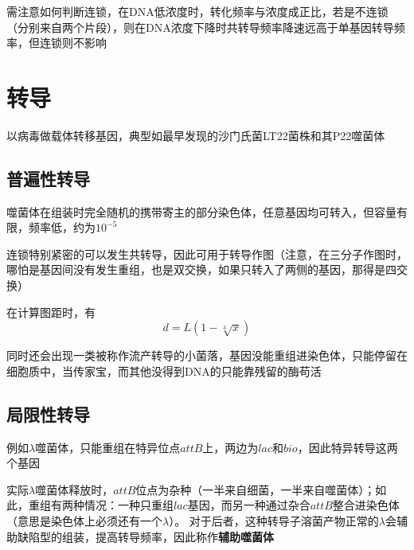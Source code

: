 \documentclass[a4paper, 12pt]{report}
\begin{document}
  需注意如何判断连锁，在DNA低浓度时，转化频率与浓度成正比，若是不连锁（分别来自两个片段），则在DNA浓度下降时共转导频率降速远高于单基因转导频率，但连锁则不影响
  \section{转导}
  以病毒做载体转移基因，典型如最早发现的沙门氏菌LT22菌株和其P22噬菌体
  \subsection{普遍性转导}
  噬菌体在组装时完全随机的携带寄主的部分染色体，任意基因均可转入，但容量有限，频率低，约为\(10^{-5}\)

  连锁特别紧密的可以发生共转导，因此可用于转导作图（注意，在三分子作图时，哪怕是基因间没有发生重组，也是双交换，如果只转入了两侧的基因，那得是四交换）

  在计算图距时，有
  \[
    d=L(1-\sqrt[3]{x})
  \]

  同时还会出现一类被称作流产转导的小菌落，基因没能重组进染色体，只能停留在细胞质中，当传家宝，而其他没得到DNA的只能靠残留的酶苟活
  \subsection{局限性转导}
  例如\(\lambda\)噬菌体，只能重组在特异位点\(attB\)上，两边为\(lac\)和\(bio\)，因此特异转导这两个基因

  实际\(\lambda\)噬菌体释放时，\(attB\)位点为杂种（一半来自细菌，一半来自噬菌体）；如此，重组有两种情况：一种只重组\(lac\)基因，而另一种通过杂合\(attB\)整合进染色体（意思是染色体上必须还有一个\(\lambda\)）。
  对于后者，这种转导子溶菌产物正常的\(\lambda\)会辅助缺陷型的组装，提高转导频率，因此称作\textbf{辅助噬菌体}
  
\end{document}
